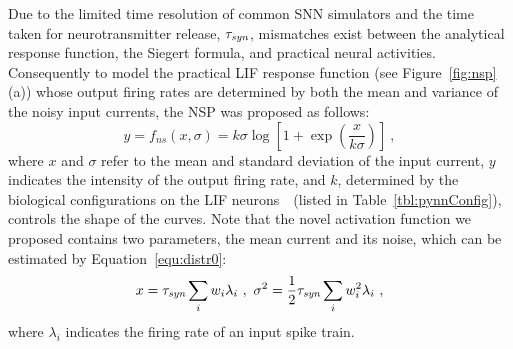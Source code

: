 %	
	Due to the limited time resolution of common SNN simulators and the time taken for neurotransmitter release, $\tau_{\textit{\textrm{syn}}}$, mismatches exist between the analytical response function, the Siegert formula, and practical neural activities.
	Consequently to model the practical LIF response function (see Figure~\ref{fig:nsp}(a)) whose output firing rates are determined by both the mean and variance of the noisy input currents, the NSP was proposed as follows:
	\begin{equation}
	y = f_{ns}(x, \sigma) = k \sigma \log [1 + \exp(\frac{x}{k \sigma})]~,
	\label{equ:nsp}
	\end{equation}
	where $x$ and $\sigma$ refer to the mean and standard deviation of the input current, $y$ indicates the intensity of the output firing rate, and $k$, determined by the biological configurations on the LIF neurons~\citep{liu2016noisy}~(listed in Table~\ref{tbl:pynnConfig}), controls the shape of the curves.
	Note that the novel activation function we proposed contains two parameters, the mean current and its noise, which can be estimated by Equation~\ref{equ:distr0}:
	\begin{equation}
	x = \tau_{\textit{\textrm{syn}}}\sum_i w_i\lambda_{i}~, ~\sigma^2=\frac{1}{2}\tau_{\textit{\textrm{syn}}}\sum_i w_i^2\lambda_{i}~,
	\label{equ:distr}
	\end{equation}
	where $\lambda_i$ indicates the firing rate of an input spike train.
